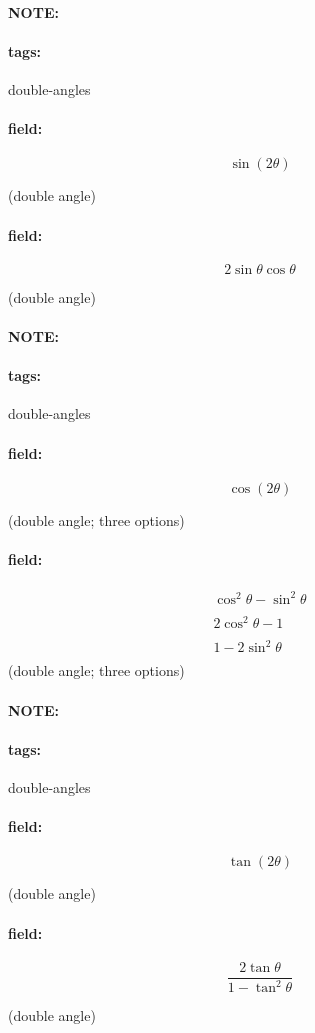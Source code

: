 \documentclass[12pt]{article}
\newenvironment{note}{\paragraph{NOTE:}}{}
\newenvironment{field}{\paragraph{field:}}{}
\newcommand*{\tags}[1]{\paragraph{tags: }#1}
\begin{document}
\begin{note}
    \tags{double-angles}
    \begin{field}
    \[  
        \sin(2\theta)
    \] 
    \begin{center}
    (double angle)
    \end{center}
    \end{field}
    \begin{field}
    \[
        2 \sin \theta \cos \theta
    \] 
    \begin{center}
    (double angle)
    \end{center}
    \end{field}
\end{note}



\begin{note}
    \tags{double-angles}
    \begin{field}
    \[  
        \cos(2\theta)
    \] 
    \begin{center}
    (double angle; three options)
    \end{center}
    \end{field}
    \begin{field}
        \begin{center}
        \begin{gather*}
        \cos^2 \theta - \sin^2 \theta \\ 
        \\
        2 \cos^2 \theta - 1 \\ 
        \\
        1 - 2 \sin^2 \theta\\
        \end{gather*}
       (double angle; three options)
        \end{center}
    \end{field}
\end{note}
 

 \begin{note}
    \tags{double-angles}
    \begin{field}
    \[  
        \tan(2\theta)  
    \] 
    \begin{center}
    (double angle)
    \end{center}
    \end{field}
    \begin{field}
    \[
        \frac{2 \tan \theta}{1 - \tan^2 \theta}
    \] 
    \begin{center}
    (double angle)
    \end{center}
    \end{field}
\end{note}
\end{document}
